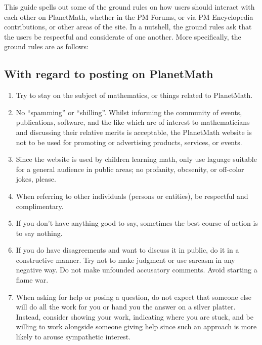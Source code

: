 This guide spells out some of the ground rules on how users should
interact with each other on PlanetMath, whether in the PM Forums, or via PM Encyclopedia contributions, or other areas of the site. In a nutshell, the ground rules ask that the users be respectful and considerate of one another. More specifically, the ground rules are as follows:

\subsection{With regard to posting on PlanetMath}
\begin{enumerate}
\item Try to stay on the subject of mathematics, or things related to PlanetMath.
\item No ``spamming'' or ``shilling''.  Whilst informing the community of events, publications, software, and the like which are of interest to mathematicians and discussing their relative merits  is acceptable, the PlanetMath website is not to be used for promoting or advertising products, services, or events.
\item Since the website is used by children learning math, only use laguage suitable for a general audience in public areas; no profanity, obcsenity, or off-color jokes, please.
\item When referring to other individuals (persons or entities), be respectful and complimentary.
\item If you don't have anything good to say, sometimes the best course of action is to say nothing.
\item If you do have disagreements and want to discuss it in public, do it in a constructive manner. Try not to make judgment or use sarcasm in any negative way. Do not make unfounded accusatory comments. Avoid starting a flame war.
\item When asking for help or posing a question, do not expect that someone else will do all the work for you or hand you the answer on a silver platter.  Instead, consider showing your work, indicating where you are stuck, and be willing to work alongside someone giving help since such an approach is more likely to arouse sympathetic interest.
\end{enumerate}

